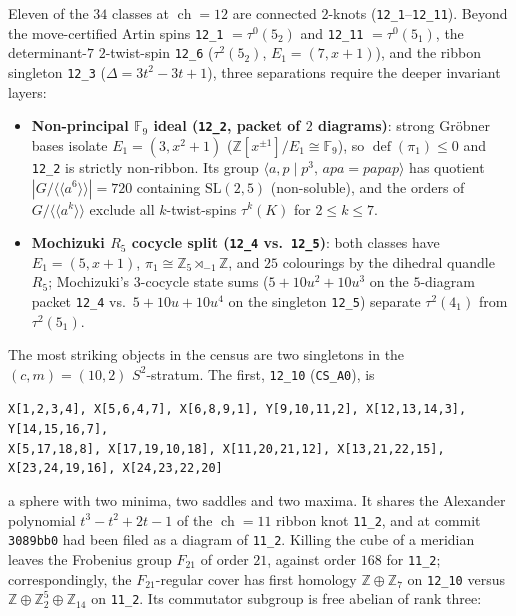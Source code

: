 \documentclass[11pt]{amsart}
\newcommand{\ch}{\operatorname{ch}}
\newcommand{\Z}{\mathbb{Z}}
\newcommand{\lab}[1]{\texttt{#1}}
\theoremstyle{plain}
\theoremstyle{remark}
\begin{document}
Eleven of the $34$ classes at $\ch=12$ are connected $2$-knots (\lab{12\_1}--\lab{12\_11}). Beyond the
move-certified Artin spins \lab{12\_1} $=\tau^0(5_2)$ and \lab{12\_11} $=\tau^0(5_1)$, the determinant-$7$
$2$-twist-spin \lab{12\_6} ($\tau^2(5_2)$, $E_1=(7,x+1)$), and the ribbon singleton \lab{12\_3}
($\Delta=3t^2-3t+1$), three separations require the deeper invariant layers:
\begin{itemize}[leftmargin=*]
\item \textbf{Non-principal $\mathbb{F}_9$ ideal (\lab{12\_2}, packet of $2$ diagrams)}: strong Gr\"obner
bases isolate $E_1=(3,x^2+1)$ ($\Z[x^{\pm 1}]/E_1\cong\mathbb{F}_9$), so $\operatorname{def}(\pi_1)\le 0$
and \lab{12\_2} is strictly non-ribbon. Its group $\langle a,p\mid p^3,\, apa=papap\rangle$ has quotient
$|G/\langle\!\langle a^6\rangle\!\rangle|=720$ containing $\mathrm{SL}(2,5)$ (non-soluble), and the orders of
$G/\langle\!\langle a^k\rangle\!\rangle$ exclude all $k$-twist-spins $\tau^k(K)$ for $2\le k\le 7$.
\item \textbf{Mochizuki $R_5$ cocycle split (\lab{12\_4} vs.\ \lab{12\_5})}: both classes have
$E_1=(5,x+1)$, $\pi_1\cong\Z_5\rtimes_{-1}\Z$, and $25$ colourings by the dihedral quandle $R_5$; Mochizuki's
$3$-cocycle state sums ($5+10u^2+10u^3$ on the $5$-diagram packet \lab{12\_4} vs.\ $5+10u+10u^4$ on the
singleton \lab{12\_5}) separate $\tau^2(4_1)$ from $\tau^2(5_1)$.
\end{itemize}

The most striking objects in the census are two singletons in the $(c,m)=(10,2)$ $S^2$-stratum. The first,
\lab{12\_10} (\lab{CS\_A0}), is
\begin{center}\scriptsize
\texttt{X[1,2,3,4], X[5,6,4,7], X[6,8,9,1], Y[9,10,11,2], X[12,13,14,3], Y[14,15,16,7],}\\
\texttt{X[5,17,18,8], X[17,19,10,18], X[11,20,21,12], X[13,21,22,15], X[23,24,19,16], X[24,23,22,20]}
\end{center}
a sphere with two minima, two saddles and two maxima. It shares the Alexander polynomial $t^3-t^2+2t-1$ of
the $\ch=11$ ribbon knot \lab{11\_2}, and at commit \texttt{3089bb0} had been filed as a diagram of
\lab{11\_2}. Killing the cube of a meridian leaves the Frobenius group $F_{21}$ of order $21$, against order
$168$ for \lab{11\_2}; correspondingly, the $F_{21}$-regular cover has first homology $\Z\oplus\Z_7$ on
\lab{12\_10} versus $\Z\oplus\Z_2^5\oplus\Z_{14}$ on \lab{11\_2}. Its commutator subgroup is free abelian of
rank three:
\end{document}
